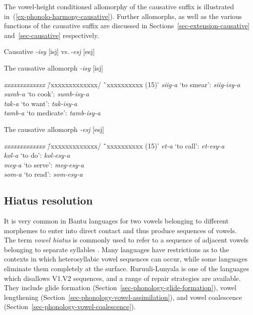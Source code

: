The vowel-height conditioned allomorphy of the  causative suffix is illustrated in~(\ref{ex-phonolo-harmony-causative}). 
Further allomorphs, as well as the various functions of the causative suffix are discussed in Sections~\ref{sec-extension-causative} and~\ref{sec-causative} respectively.

\ea Causative \textit{-isy} [isj] vs.\,\textit{-esj} [esj] \label{ex-phonolo-harmony-causative}
\begin{xlist}

\ex The causative allomorph \textit{-isy} [isj] \label{ex-phonolo-harmony-causative-isy}
\begin{tabbing}
 \textit{xxxxxxxxxxxxx} \= /xxxxxxxxxxxxx/ \=`xxxxxxxxxx (15)'\kill
	 \textit{siig-a} \>`to smear': \> \textit{siig-isy-a}\\
	 \textit{sumb-a} \>`to cook':\>  \textit{sumb-isy-a}\\
	 \textit{tak-a}\> `to want': \>  \textit{tak-isy-a}\\
	 \textit{tamb-a} \>`to medicate':\>   \textit{tamb-isy-a}
\end{tabbing}

\ex The causative allomorph \textit{-esj} [esj] \label{ex-phonolo-harmony-causative-esy}
\begin{tabbing}
	 \textit{xxxxxxxxxxxxx} \= /xxxxxxxxxxxxx/ \=`xxxxxxxxxx (15)'\kill
	 \textit{et-a} \>`to call':\>  \textit{et-esy-a}\\
	 \textit{kol-a} \>`to do':\> \textit{kol-esy-a}\\
	 \textit{meg-a} \>`to serve': \>  \textit{meg-esy-a}\\
	 \textit{som-a}\> `to read':\>  \textit{som-esy-a}
\end{tabbing}
\end{xlist}
\z

\subsection{Hiatus resolution}\label{sec-phonology-vowel-hiatus}

It is very common in Bantu languages for two vowels belonging to different morphemes to enter into direct contact and thus produce sequences of vowels. 
The term  \textit{vowel hiatus} is commonly used to refer to a sequence of adjacent vowels belonging to separate syllables \citep{Casali2011Hiatus}. 
Many languages have restrictions as to the contexts in which heterosyllabic vowel sequences can occur, while some languages eliminate them completely at the surface.  
Ruruuli-Lunyala is one of the languages which disallows V1.V2 sequences, and a range of repair strategies are available. 
They include glide formation (Section~\ref{sec-phonology-glide-formation}), vowel lengthening (Section~\ref{sec-phonology-vowel-assimilation}), and vowel coalescence (Section~\ref{sec-phonology-vowel-coalescence}).

